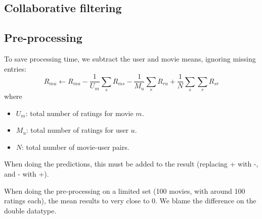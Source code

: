\subsection{Collaborative filtering}

\subsection{Pre-processing}
To save processing time, we subtract the user and movie means, ignoring missing entries:
\[
    R_{mu} \gets R_{mu} - \frac{1}{U_m}\sum_{s}{R_{ms}} - \frac{1}{M_u}\sum_{r}{R_{ru}} + \frac{1}{N}\sum_{s}\sum_{r}{R_{sr}}
\]
where
\begin{itemize}
    \item $U_m$: total number of ratings for movie $m$.
    \item $M_u$: total number of ratings for user $u$.
    \item $N$: total number of movie-user pairs.
\end{itemize}
%
When doing the predictions, this must be added to the result (replacing + with -, and - with +).

When doing the pre-processing on a limited set (100 movies, with around 100 ratings each), the mean results to very close to 0. We blame the difference on the double datatype.